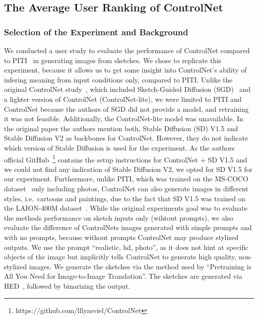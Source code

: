 \subsection{The Average User Ranking of ControlNet}
\subsubsection{Selection of the Experiment and Background}
We conducted a user study to evaluate the performance of ControlNet compared to PITI~\cite{wang2022pretrainingneedimagetoimagetranslation} in generating images from sketches. We chose to replicate this experiment, because it allows us to get some insight into ControlNet's ability of infering meaning from input conditions only, compared to PITI.
Unlike the original ControlNet study~\cite{zhang2023addingconditionalcontroltexttoimage}, which included Sketch-Guided Diffusion (SGD)~\cite{voynov2022sketchguidedtexttoimagediffusionmodels} and a lighter version of ControlNet (ControlNet-lite), we were limited to PITI and ControlNet because the authors of SGD did not provide a model, and retraining it was not feasible. Additionally, the ControlNet-lite model was unavailable. In the original paper the authors mention both, Stable Diffusion (SD) V1.5 and Stable Diffusion V2 as backbones for ControlNet. However, they do not indicate which version of Stable Diffusion is used for the experiment. As the authors official GitHub~\footnote{https://github.com/lllyasviel/ControlNet} contains the setup instructions for ControlNet + SD V1.5 and we could not find any indication of Stable Diffusion V2, we opted for SD V1.5 for our experiment. Furthermore, unlike PITI, which was trained on the MS-COCO dataset~\cite{lin2015microsoftcococommonobjects} only including photos, ControlNet can also generate images in different styles, i.e.\ cartoons and paintings, due to the fact that SD V1.5 was trained on the LAION-400M dataset~\cite{schuhmann2021laion400mopendatasetclipfiltered}. While the original experiments goal was to evaluate the methods performance on sketch inputs only (wihtout prompts), we also evaluate the difference of ControlNets images generated with simple prompts and with no prompts, because without prompts ControlNet may produce stylized outputs. We use the prompt ``realistic, hd, photo'', as it does not hint at specific objects of the image but implicitly tells ControlNet to generate high quality, non-stylized images. We generate the sketches via the method used by ``Pretraining is All You Need for Image-to-Image
Translation''. The sketches are generated via HED~\cite{xie2015holisticallynestededgedetection}, followed by binarizing the output.

